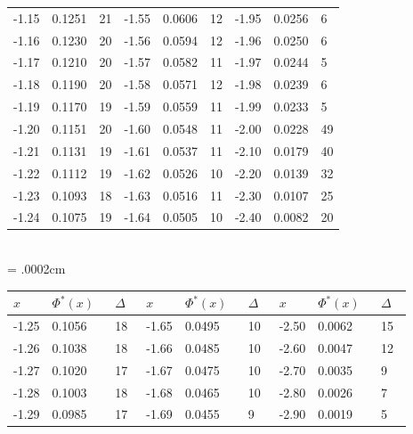 \documentclass[russian, 12pt, fleqn]{article}
\begin{document}
\begin{tabular}[b]{ | l | l |  l || l | l | l || l | l |  l |  }
-1.15&0.1251&21&-1.55&0.0606&12&-1.95&0.0256&6\\%
-1.16&0.1230&20&-1.56&0.0594&12&-1.96&0.0250&6\\%
-1.17&0.1210&20&-1.57&0.0582&11&-1.97&0.0244&5 \\%
-1.18&0.1190&20&-1.58&0.0571&12&-1.98&0.0239&6 \\%
-1.19&0.1170&19&-1.59&0.0559&11&-1.99&0.0233&5 \\%
%
-1.20&0.1151&20&-1.60&0.0548&11&-2.00&0.0228&49 \\%
-1.21&0.1131&19&-1.61&0.0537&11&-2.10&0.0179&40\\%
-1.22&0.1112&19&-1.62&0.0526&10&-2.20&0.0139&32 \\%
-1.23&0.1093&18&-1.63&0.0516&11&-2.30&0.0107&25 \\%
-1.24&0.1075&19&-1.64&0.0505&10&-2.40&0.0082&20 \\%
\hline
\end{tabular}\\
\newpage
\newdimen \colwidth \colwidth = .0002cm
\noindent 
\begin{tabular}[b]{ | l | l | l || l | l | l || l | l | l |   }
\hline
$x\ \ \ \ \ $&$\Phi^*(x)\ \ \ $&$\Delta\ \ \ $&$x\ \ \ \ \ $&$\Phi^*(x)\ \ \ $&$\Delta\ \ \ $&$x\ \ \ \ \ $&$\Phi^*(x)\ \ \ $&$\Delta\ \ \ $\\
\hline
-1.25&0.1056&18&-1.65&0.0495&10&-2.50&0.0062&15 \\%
-1.26&0.1038&18&-1.66&0.0485&10&-2.60&0.0047&12 \\%
-1.27&0.1020&17&-1.67&0.0475&10&-2.70&0.0035&9   \\%
-1.28&0.1003&18&-1.68&0.0465&10&-2.80&0.0026&7   \\%
-1.29&0.0985&17&-1.69&0.0455&9  &-2.90&0.0019&5   \\%
\hline
\end{tabular}\\
\\
\\
\noindent 
\end{document}
